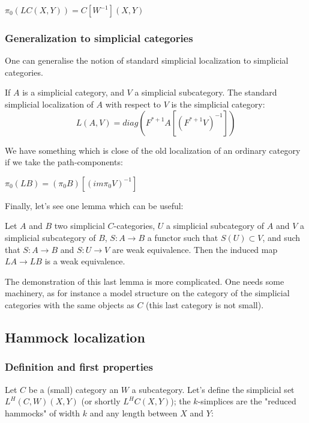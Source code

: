 \begin{prop}
$\pi_0 (LC(X,Y))=C[W^{-1}](X,Y)$
\end{prop}

\subsubsection{Generalization to simplicial categories}

One can generalise the notion of standard simplicial localization to simplicial categories.

\begin{defin}
If $A$ is a simplicial category, and $V$ a simplicial subcategory. The standard simplicial localization of $A$ with respect to $V$ is the simplicial category:
\begin{equation}
L(A,V)=diag(F^{*+1}A[(F^{*+1}V)^{-1}])
\end{equation} 
\end{defin}

We have something which is close of the old localization of an ordinary category if we take the path-components:
\begin{prop}
$\pi_0 (LB) =(\pi_0 B)[(im \pi_0 V)^{-1}]$
\end{prop}

Finally, let's see one lemma which can be useful:

\begin{lemma}
Let $A$ and $B$ two simplicial $C$-categories, $U$ a simplicial subcategory of $A$ and $V$ a simplicial subcategory of $B$, $S: A \rightarrow B$ a functor such that $S(U) \subset V$, and such that $S: A \rightarrow B$ and $S: U \rightarrow V$ are weak equivalence. Then the induced map $LA \rightarrow LB$ is a weak equivalence.
\end{lemma}

The demonstration of this last lemma is more complicated. One needs some machinery, as for instance a model structure on the category of the simplicial categories with the same objects as $C$ (this last category is not small).


\subsection{Hammock localization}

\subsubsection{Definition and first properties}
Let $C$ be a (small) category an $W$ a subcategory. Let's define the simplicial set $L^H (C,W)(X,Y)$ (or shortly $L^H C(X,Y)$); the $k$-simplices are the "reduced hammocks" of width $k$ and any length between $X$ and $Y$:

